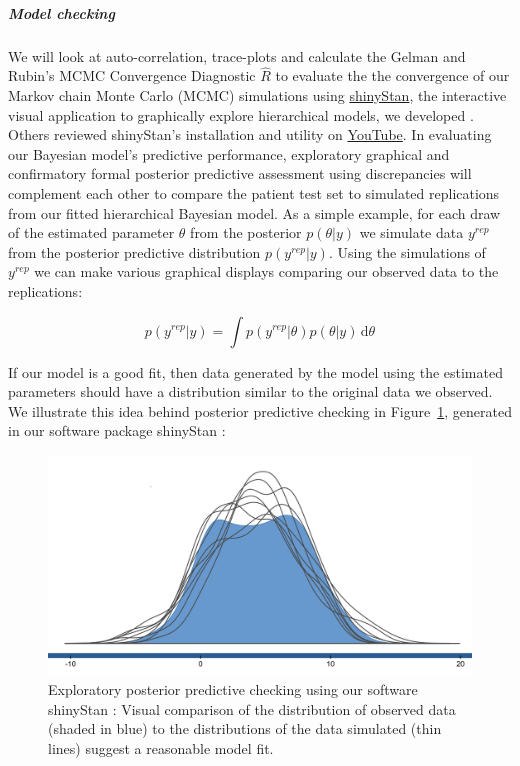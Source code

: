 \documentclass[11pt,notitlepage]{article}
\begin{document}
\subparagraph*{Model checking}
We will look at auto-correlation, trace-plots and calculate the Gelman and Rubin's MCMC Convergence Diagnostic $ \hat{R}$ to evaluate the the convergence of our Markov chain Monte Carlo (MCMC) simulations using \href{http://andrewgelman.com/2015/03/02/introducing-shinystan/}{shinyStan}, the interactive visual application to graphically explore hierarchical models, we developed \cite{shinystan-software:2015}. Others reviewed shinyStan's installation and utility on \href{https://www.youtube.com/watch?v=X31xqNHcvQs}{YouTube}. In evaluating our Bayesian model's predictive performance, exploratory graphical \cite{Gelman2004posteriorpredictivechecks} and confirmatory formal posterior predictive assessment using discrepancies \cite{GelmanMengStern1996} will complement each other to compare the patient test set to simulated replications from our fitted hierarchical Bayesian model. As a simple example, for each draw of the estimated parameter $\theta$ from the posterior $p(\theta|y)$ we simulate data $y^{rep}$ from the posterior predictive distribution $ p(y^{rep}|y) $. Using the simulations of $y^{rep}$ we can make various graphical displays comparing our observed data to the replications: 
\begin{figure}
\vspace{-11pt}
\begin{equation} \label{eq:predictivecheck}
 p(y^{rep}|y)  = \int \! p(y^{rep}|\theta) p(\theta|y) \, \mathrm{d}\theta 
\end{equation}
\vspace{-10pt}
\end{figure}
If our model is a good fit, then data generated by the model using the estimated parameters should have a distribution similar to the original data we observed. We illustrate this idea behind posterior predictive checking \cite{Gelman_predictive_2000} in Figure~\ref{fig:posteriorpredictivecheck}, generated in our software package shinyStan \cite{shinystan-software:2015}:
\begin{figure} 
 \vspace{-15pt}
 \includegraphics[scale=0.2]{Figures/posteriorpredictivecheck.png} 
  \caption{\footnotesize Exploratory posterior predictive checking using our software shinyStan \cite{shinystan-software:2015}: Visual comparison of the distribution of observed data (shaded in blue) to the distributions of the data simulated (thin lines) suggest a reasonable model fit.}
  \label{fig:posteriorpredictivecheck}
  \vspace{-10pt}
\end{figure}
\end{document}
